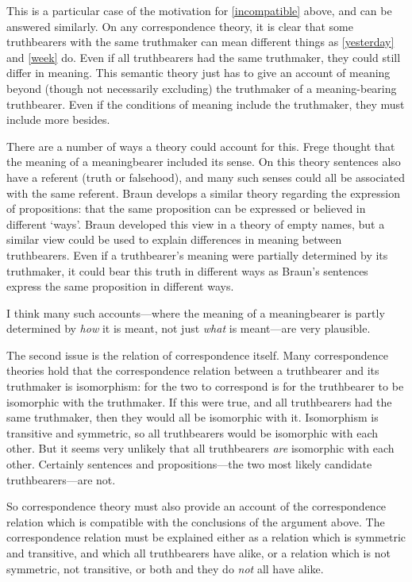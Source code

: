 This is a particular case of the motivation for \ref{incompatible} above, and can be answered similarly.
On any correspondence theory, it is clear that some truthbearers with the same truthmaker can mean different things as \ref{yesterday} and \ref{week} do.
Even if all truthbearers had the same truthmaker, they could still differ in meaning.
This semantic theory just has to give an account of meaning beyond (though not necessarily excluding) the truthmaker of a meaning-bearing truthbearer.
Even if the conditions of meaning include the truthmaker, they must include more besides.

There are a number of ways a theory could account for this.
Frege thought that the meaning of a meaningbearer included its sense.
\parencite[210]{Frege_1948} 
On this theory sentences also have a referent (truth or falsehood), and many such senses could all be associated with the same referent.
Braun develops a similar theory regarding the expression of propositions: that the same proposition can be expressed or believed in different `ways'.
Braun developed this view in a theory of empty names, but a similar view could be used to explain differences in meaning between truthbearers.
Even if a truthbearer's meaning were partially determined by its truthmaker, it could bear this truth in different ways as Braun's sentences express the same proposition in different ways.

I think many such accounts---where the meaning of a meaningbearer is partly determined by \emph{how} it is meant, not just \emph{what} is meant---are very plausible.

The second issue is the relation of correspondence itself.
Many correspondence theories hold that the correspondence relation between a truthbearer and its truthmaker is isomorphism: for the two to correspond is for the truthbearer to be isomorphic with the truthmaker.
If this were true, and all truthbearers had the same truthmaker, then they would all be isomorphic with it.
Isomorphism is transitive and symmetric, so all truthbearers would be isomorphic with each other.
But it seems very unlikely that all truthbearers \emph{are} isomorphic with each other.
Certainly sentences and propositions---the two most likely candidate truthbearers---are not.

So correspondence theory must also provide an account of the correspondence relation which is compatible with the conclusions of the argument above.
The correspondence relation must be explained either as a relation which is symmetric and transitive, and which all truthbearers have alike, or a relation which is not symmetric, not transitive, or both and they do \emph{not} all have alike.

